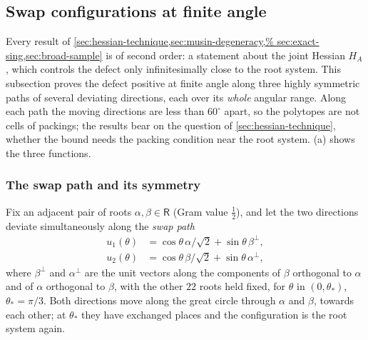 \documentclass[11pt,reqno]{amsart}
\renewcommand{\_}{\origunderscore\allowbreak}
\numberwithin{equation}{section}
\theoremstyle{plain}
\theoremstyle{definition}
\theoremstyle{remark}
\newcommand{\Rt}{\mathsf{R}}                 %
\begin{document}
\subsection{Swap configurations at finite angle}\label{sec:swap-configs}

Every result of \cref{sec:hessian-technique,sec:musin-degeneracy,%
sec:exact-sing,sec:broad-sample} is of second order: a statement about
the joint Hessian $H_A$, which controls the defect only infinitesimally
close to the root system. This subsection proves the defect positive at
finite angle along three highly symmetric paths of several deviating
directions, each over its \emph{whole} angular range. Along each path
the moving directions are less than $60^\circ$ apart, so the polytopes
are not cells of packings; the results bear on the question of
\cref{sec:hessian-technique}, whether the bound needs the packing
condition near the root system. (a) shows the three
functions.

\subsubsection{The swap path and its symmetry}\label{sec:swap-setup}

Fix an adjacent pair of roots $\alpha,\beta\in\Rt$ (Gram value
$\tfrac12$), and let the two directions deviate simultaneously along the
\emph{swap path}
\[
\begin{aligned}
  u_1(\theta) &= \cos\theta\,\alpha/\sqrt2 + \sin\theta\,\beta^\perp,\\
  u_2(\theta) &= \cos\theta\,\beta/\sqrt2 + \sin\theta\,\alpha^\perp,
\end{aligned}
\]
where $\beta^\perp$ and $\alpha^\perp$ are the unit vectors along the
components of $\beta$ orthogonal to $\alpha$ and of $\alpha$ orthogonal
to $\beta$, with the other $22$ roots held fixed, for $\theta$ in
$(0,\theta_*)$, $\theta_*=\pi/3$. Both directions move along the great
circle through $\alpha$ and $\beta$, towards each other; at $\theta_*$
they have exchanged places and the configuration is the root system
again.
\end{document}
